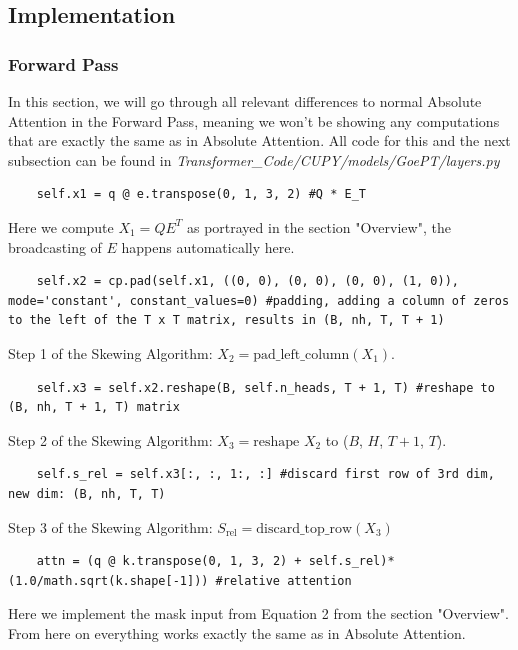 \documentclass[a4paper,12pt]{extarticle}
\begin{document}
\subsection{Implementation}
\subsubsection{Forward Pass}
In this section, we will go through all relevant differences to normal Absolute Attention in the Forward Pass, meaning we won't be showing any computations that are exactly the same as in Absolute Attention. All code for this and the next subsection can be found in \textit{Transformer\_Code/CUPY/models/GoePT/layers.py}\newline
\begin{lstlisting}
    self.x1 = q @ e.transpose(0, 1, 3, 2) #Q * E_T
\end{lstlisting}
Here we compute $X_1 = QE^T$ as portrayed in the section "Overview", the broadcasting of $E$ happens automatically here.\newline
\begin{lstlisting}
    self.x2 = cp.pad(self.x1, ((0, 0), (0, 0), (0, 0), (1, 0)), mode='constant', constant_values=0) #padding, adding a column of zeros to the left of the T x T matrix, results in (B, nh, T, T + 1)
\end{lstlisting}
Step 1 of the Skewing Algorithm: \( X_2 = \text{pad\_left\_column}(X_1) \).\newline

\begin{lstlisting}
    self.x3 = self.x2.reshape(B, self.n_heads, T + 1, T) #reshape to (B, nh, T + 1, T) matrix
\end{lstlisting}
Step 2 of the Skewing Algorithm: \( X_3 = \text{reshape } X_2\) to ($B$, $H$, $T + 1$, $T$). \newline

\begin{lstlisting}
    self.s_rel = self.x3[:, :, 1:, :] #discard first row of 3rd dim, new dim: (B, nh, T, T)
\end{lstlisting}
Step 3 of the Skewing Algorithm: \( S_\text{rel} = \text{discard\_top\_row}(X_3)\)\newline

\begin{lstlisting}
    attn = (q @ k.transpose(0, 1, 3, 2) + self.s_rel)*(1.0/math.sqrt(k.shape[-1])) #relative attention
\end{lstlisting}
Here we implement the mask input from Equation 2 from the section "Overview". From here on everything works exactly the same as in Absolute Attention.
\end{document}

